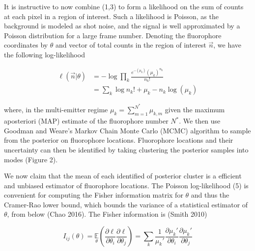 \documentclass[a4paper, twocolumn, superscriptaddress,prl]{revtex4}  %
\begin{document}
It is instructive to now combine (1,3) to form a likelihood on the sum of counts at each pixel in a region of interest. Such a likelihood is Poisson, as the background is modeled as shot noise, and the signal is well approximated by a Poisson distribution for a large frame number. Denoting the fluorophore coordinates by $\theta$ and vector of total counts in the region of interest $\vec{n}$, we have the following log-likelihood

\begin{align}
\ell(\vec{n}|\theta) &= -\log \prod_{k} \frac{e^{-\left(\mu_{k}\right)}\left(\mu_{k}\right)^{n_{k}}}{n_{k}!}\\
&= \sum_{k}  \log n_{k}! + \mu_{k} - n_{k}\log\left(\mu_{k}\right)
\end{align}

where, in the multi-emitter regime $\mu_{k} = \sum_{m=1}^{N^{*}} \mu_{k,m}$ given the maximum aposteriori (MAP) estimate of the fluorophore number $N^{*}$. We then use Goodman and Weare's Markov Chain Monte Carlo (MCMC) algorithm to sample from the posterior on fluorophore locations. Fluorophore locations and their uncertainty can then be identified by taking clustering the posterior samples into modes (Figure 2). 

We now claim that the mean of each identified of posterior cluster is a efficient and unbiased estimator of fluorophore locations. The Poisson log-likelihood (5) is convenient for computing the Fisher information matrix for $\theta$ and thus the Cramer-Rao lower bound, which bounds the variance of a statistical estimator of $\theta$, from below (Chao 2016). The Fisher information is (Smith 2010)

\begin{equation}
I_{ij}(\theta) = \underset{\theta}{\mathbb{E}}\left(\frac{\partial \ell}{\partial\theta_{i}}\frac{\partial\ell}{\partial\theta_{j}}\right) = \sum_{k}\frac{1}{\mu_{k}'}\frac{\partial \mu_{k}'}{\partial\theta_{i}}\frac{\partial \mu_{k}'}{\partial\theta_{j}}
\end{equation}

\clearpage

 
\end{document}
